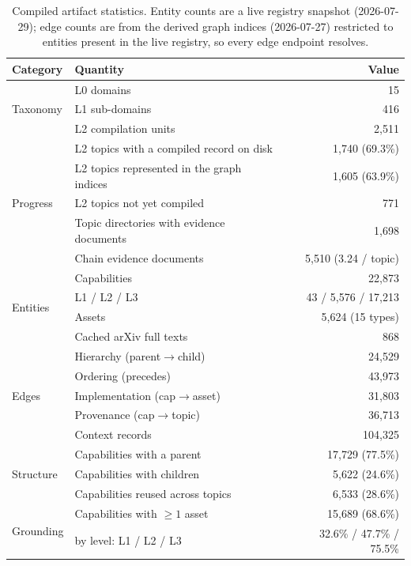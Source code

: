 \documentclass[10pt,a4paper]{article}
\begin{document}
\begin{table}[htbp]
\centering\small
\caption{Compiled artifact statistics. Entity counts are a live registry snapshot (2026-07-29); edge counts are from the derived graph indices (2026-07-27) restricted to entities present in the live registry, so every edge endpoint resolves.}
\label{tab:stats}
\begin{tabular}{@{}llr@{}}
\toprule
Category & Quantity & Value \\
\midrule
\multirow{3}{*}{Taxonomy}
 & L0 domains & 15 \\
 & L1 sub-domains & 416 \\
 & L2 compilation units & 2{,}511 \\
\midrule
\multirow{5}{*}{Progress}
 & L2 topics with a compiled record on disk & 1{,}740 (69.3\%) \\
 & L2 topics represented in the graph indices & 1{,}605 (63.9\%) \\
 & L2 topics not yet compiled & 771 \\
 & Topic directories with evidence documents & 1{,}698 \\
 & Chain evidence documents & 5{,}510 (3.24 / topic) \\
\midrule
\multirow{4}{*}{Entities}
 & Capabilities & 22{,}873 \\
 & \quad L1 / L2 / L3 & 43 / 5{,}576 / 17{,}213 \\
 & Assets & 5{,}624 (15 types) \\
 & Cached arXiv full texts & 868 \\
\midrule
\multirow{5}{*}{Edges}
 & Hierarchy (parent$\rightarrow$child) & 24{,}529 \\
 & Ordering (precedes) & 43{,}973 \\
 & Implementation (cap$\rightarrow$asset) & 31{,}803 \\
 & Provenance (cap$\rightarrow$topic) & 36{,}713 \\
 & Context records & 104{,}325 \\
\midrule
\multirow{3}{*}{Structure}
 & Capabilities with a parent & 17{,}729 (77.5\%) \\
 & Capabilities with children & 5{,}622 (24.6\%) \\
 & Capabilities reused across topics & 6{,}533 (28.6\%) \\
\midrule
\multirow{3}{*}{Grounding}
 & Capabilities with $\geq 1$ asset & 15{,}689 (68.6\%) \\
 & \quad by level: L1 / L2 / L3 & 32.6\% / 47.7\% / 75.5\% \\

\end{tabular}
\end{table}
\end{document}

